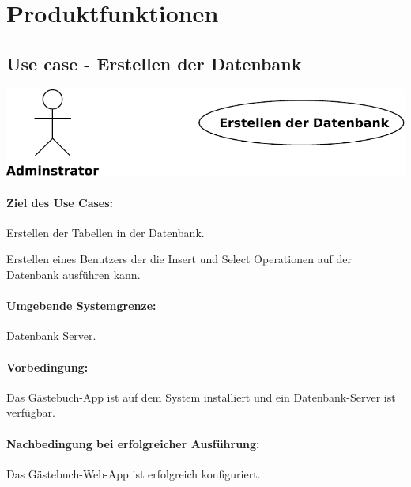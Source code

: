 \section{Produktfunktionen}

\subsection{Use case - Erstellen der Datenbank}

\begin{figurehere}
\includegraphics[width=\columnwidth]{use-case-create_db}
\end{figurehere}

\paragraph{Ziel des Use Cases:}

\begin{asparaitem}
\item Erstellen der Tabellen in der Datenbank. 
\item Erstellen eines Benutzers der die Insert und Select Operationen auf der Datenbank ausführen kann. 
\end{asparaitem}


\paragraph{Umgebende Systemgrenze:}

Datenbank Server.

\paragraph{Vorbedingung:}

Das Gästebuch-App ist auf dem System installiert und ein Datenbank-Server
ist verfügbar.

\paragraph{Nachbedingung bei erfolgreicher Ausführung:}

\begin{asparaitem}
\item Das Gästebuch-Web-App ist erfolgreich konfiguriert.
\end{asparaitem}

